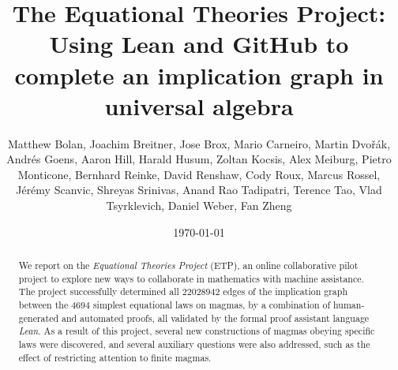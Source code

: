 \documentclass[12pt]{amsart}
\title[Equational Theories Project]{The Equational Theories Project: Using Lean and GitHub to complete an implication graph in universal algebra}
\author[Equational Theories Project contributors]{Matthew Bolan, Joachim Breitner, Jose Brox, Mario Carneiro, Martin Dvo\v{r}\'ak, Andr\'es Goens, Aaron Hill, Harald Husum, Zoltan Kocsis, Alex Meiburg, Pietro Monticone, Bernhard Reinke, David Renshaw, Cody Roux, Marcus Rossel, J\'er\'emy Scanvic, Shreyas Srinivas, Anand Rao Tadipatri, Terence Tao, Vlad Tsyrklevich, Daniel Weber, Fan Zheng}
\date{\today}
\theoremstyle{definition}
\begin{document}
\begin{abstract}
  We report on the \emph{Equational Theories Project} (ETP), an online collaborative pilot project
  to explore new ways to collaborate in mathematics with machine assistance. The project successfully determined all $\num{22028942}$ edges of the implication graph between the $4694$ simplest equational laws on magmas, by a combination of
  human-generated and automated proofs, all validated by the formal proof assistant language
  \emph{Lean}. As a result of this project, several new constructions of magmas obeying specific laws were discovered, and several auxiliary questions were also addressed, such as the effect of restricting attention to finite magmas.
\end{abstract}

\maketitle

\tableofcontents








% 






\appendix







\listoftodos{}
\end{document}
